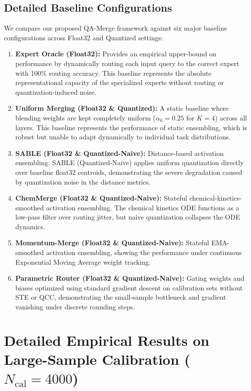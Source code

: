 \documentclass{article}
\theoremstyle{plain}
\theoremstyle{definition}
\theoremstyle{remark}
\begin{document}
\subsection{Detailed Baseline Configurations}
\label{app:baselines_detail}
We compare our proposed QA-Merge framework against six major baseline configurations across Float32 and Quantized settings:
\begin{enumerate}
    \item \textbf{Expert Oracle (Float32):} Provides an empirical upper-bound on performance by dynamically routing each input query to the correct expert with 100\% routing accuracy. This baseline represents the absolute representational capacity of the specialized experts without routing or quantization-induced noise.
    \item \textbf{Uniform Merging (Float32 \& Quantized):} A static baseline where blending weights are kept completely uniform ($\alpha_k = 0.25$ for $K=4$) across all layers. This baseline represents the performance of static ensembling, which is robust but unable to adapt dynamically to individual task distributions.
    \item \textbf{SABLE (Float32 \& Quantized-Naive):} Distance-based activation ensembling. SABLE (Quantized-Naive) applies uniform quantization directly over baseline float32 centroids, demonstrating the severe degradation caused by quantization noise in the distance metrics.
    \item \textbf{ChemMerge (Float32 \& Quantized-Naive):} Stateful chemical-kinetics-smoothed activation ensembling. The chemical kinetics ODE functions as a low-pass filter over routing jitter, but naive quantization collapses the ODE dynamics.
    \item \textbf{Momentum-Merge (Float32 \& Quantized-Naive):} Stateful EMA-smoothed activation ensembling, showing the performance under continuous Exponential Moving Average weight tracking.
    \item \textbf{Parametric Router (Float32 \& Quantized-Naive):} Gating weights and biases optimized using standard gradient descent on calibration sets without STE or QCC, demonstrating the small-sample bottleneck and gradient vanishing under discrete rounding steps.
\end{enumerate}


\section{Detailed Empirical Results on Large-Sample Calibration ($N_{\text{cal}} = 4000$)}
\label{app:large_sample_results}
\end{document}
